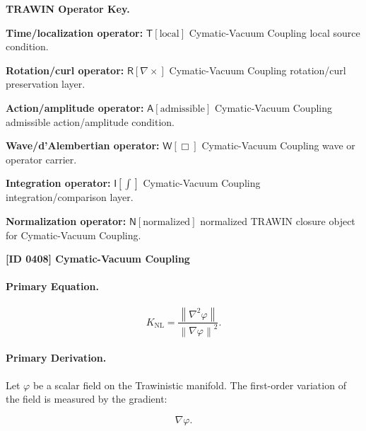 \par\vspace{0.45\baselineskip}
\noindent\begin{minipage}[t]{\linewidth}
\begingroup
\small
\raggedright
\textbf{TRAWIN Operator Key.}\par
\noindent\textbf{Time/localization operator:} $\mathsf{T}\!\left[\mathrm{local}\right]$ Cymatic-Vacuum Coupling local source condition.\par
\noindent\textbf{Rotation/curl operator:} $\mathsf{R}\!\left[\nabla\times\right]$ Cymatic-Vacuum Coupling rotation/curl preservation layer.\par
\noindent\textbf{Action/amplitude operator:} $\mathsf{A}\!\left[\mathrm{admissible}\right]$ Cymatic-Vacuum Coupling admissible action/amplitude condition.\par
\noindent\textbf{Wave/d'Alembertian operator:} $\mathsf{W}\!\left[\Box\right]$ Cymatic-Vacuum Coupling wave or operator carrier.\par
\noindent\textbf{Integration operator:} $\mathsf{I}\!\left[\int\right]$ Cymatic-Vacuum Coupling integration/comparison layer.\par
\noindent\textbf{Normalization operator:} $\mathsf{N}\!\left[\mathrm{normalized}\right]$ normalized TRAWIN closure object for Cymatic-Vacuum Coupling.\par
\endgroup
\end{minipage}

\clearpage
\noindent\textbf{[ID 0408] Cymatic-Vacuum Coupling}\par
\vspace{0.35em}
\paragraph{Primary Equation.}
\begin{equation}
K_{\mathrm{NL}}
=
\frac{\left\lVert \nabla^{2}\varphi\right\rVert}
{\left\lVert \nabla\varphi\right\rVert^{2}} .
\end{equation}

\paragraph{Primary Derivation.}
Let $\varphi$ be a scalar field on the Trawinistic manifold.  
The first-order variation of the field is measured by the gradient:

\begin{equation}
\nabla\varphi .
\end{equation}

